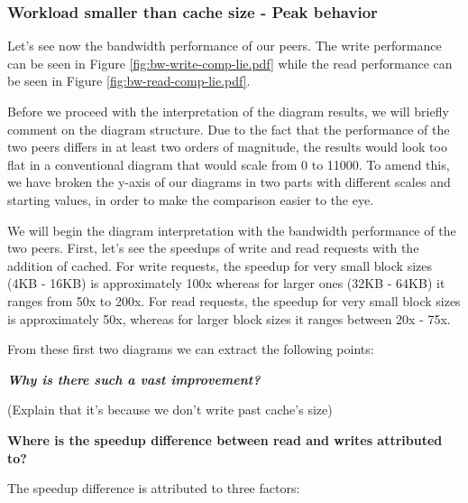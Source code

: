 \subsubsection{Workload smaller than cache size - Peak behavior}

Let's see now the bandwidth performance of our peers. The write performance can 
be seen in Figure \ref{fig:bw-write-comp-lie.pdf} while the read performance 
can be seen in Figure \ref{fig:bw-read-comp-lie.pdf}.


Before we proceed with the interpretation of the diagram results, we will 
briefly comment on the diagram structure. Due to the fact that the performance 
of the two peers differs in at least two orders of magnitude, the results would 
look too flat in a conventional diagram that would scale from 0 to 11000. To 
amend this, we have broken the y-axis of our diagrams in two parts with 
different scales and starting values, in order to make the comparison easier to 
the eye.

We will begin the diagram interpretation with the bandwidth performance of the 
two peers. First, let's see the speedups of write and read requests with the 
addition of cached. For write requests, the speedup for very small block sizes 
(4KB - 16KB) is approximately 100x whereas for larger ones (32KB - 64KB) it 
ranges from 50x to 200x. For read requests, the speedup for very small block 
sizes is approximately 50x, whereas for larger block sizes it ranges between 
20x - 75x.

From these first two diagrams we can extract the following points:

\textit{\textbf{Why is there such a vast improvement?}}

(Explain that it's because we don't write past cache's size)

\textbf{Where is the speedup difference between read and writes attributed to?}

The speedup difference is attributed to three factors:

